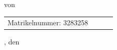 \begin{titlepage}
\begin{center}
		\textbf{\Large \subjectDocument}

		\vspace*{0.5cm}
		
		{\normalsize von}
		
		\vspace*{0.5cm}
		
		\textbf{\Large \authorDocument}
	
		\vspace*{3.5cm}
		
		\begin{minipage}[t]{13cm}
			\begin{center}
				\begin{tabular}{llll}
					Matrikelnummer: 3283258 \\
				\end{tabular}
			\end{center}
		\end{minipage}
		
		\vspace*{2.5cm}
	
		{\large \locationDocument, den \dateDocument}
	\end{center}
\end{titlepage}
